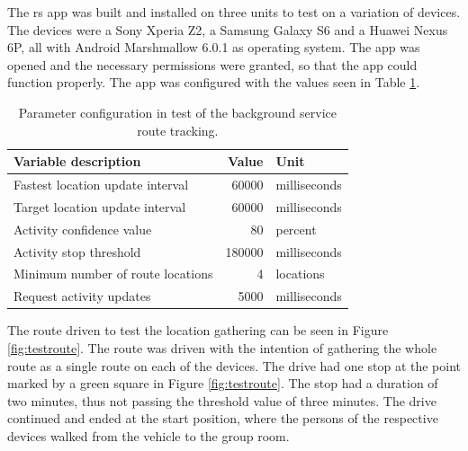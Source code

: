 The \gls{rs} app was built and installed on three units to test on a variation of devices.
The devices were a Sony Xperia Z2, a Samsung Galaxy S6 and a Huawei Nexus 6P, all with Android Marshmallow 6.0.1 as operating system.
The app was opened and the necessary permissions were granted, so that the app could function properly.
The app was configured with the values seen in Table \ref{tab:appconfig}.

\begin{table}[!ht]
	\centering
	\begin{tabular}{l r l}
		Variable description & Value & Unit\\
		\hline
		Fastest location update interval & 60000 & milliseconds\\
		Target location update interval & 60000 & milliseconds\\ 
		Activity confidence value & 80 & percent\\
		Activity stop threshold & 180000 & milliseconds\\
		Minimum number of route locations & 4 & locations \\
		Request activity updates & 5000 & milliseconds\\ 
	\end{tabular}
	\caption{Parameter configuration in test of the background service route tracking.}
	\label{tab:appconfig}
\end{table}

The route driven to test the location gathering can be seen in Figure \ref{fig:testroute}.
The route was driven with the intention of gathering the whole route as a single route on each of the devices.
The drive had one stop at the point marked by a green square in Figure \ref{fig:testroute}.
The stop had a duration of two minutes, thus not passing the threshold value of three minutes.
The drive continued and ended at the start position, where the persons of the respective devices walked from the vehicle to the group room.

